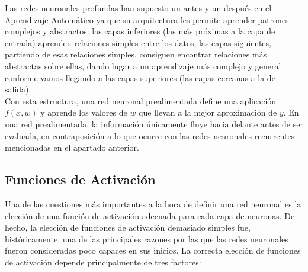  Las redes neuronales profundas han supuesto un antes y un después en el Aprendizaje Automático ya que su arquitectura les permite aprender patrones complejos y abstractos: las capas inferiores (las más próximas a la capa de entrada) aprenden relaciones simples entre los datos, las capas siguientes, partiendo de esas relaciones simples, consiguen encontrar relaciones más abstractas sobre ellas, dando lugar a un aprendizaje más complejo y general conforme vamos llegando a las capas superiores (las capas cercanas a la de salida). \\


Con esta estructura, una red neuronal prealimentada define una aplicación $f(x,w)$ y aprende los valores de $w$ que llevan a la mejor aproximación de $y$. En una red prealimentada, la información únicamente fluye hacia delante antes de ser evaluada, en contraposición a lo que ocurre con las redes neuronales recurrentes mencionadas en el apartado anterior. 

\subsection{Funciones de Activación}
Una de las cuestiones más importantes a la hora de definir una red neuronal es la elección de una función de activación adecuada para cada capa de neuronas. De hecho, la elección de funciones de activación demasiado simples fue, históricamente, una de las principales razones por las que las redes neuronales fueron consideradas poco capaces en sus inicios. La correcta elección de funciones de activación depende principalmente de tres factores: 


